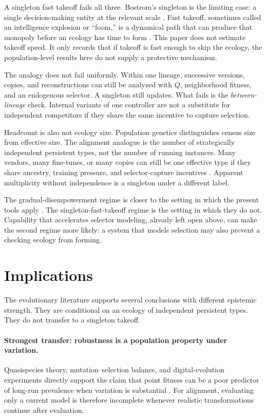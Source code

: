\documentclass[11pt]{article}
\begin{document}
A singleton fast takeoff fails all three. Bostrom's singleton is the limiting case: a single decision-making entity at the relevant scale \parencite{bostrom2014}. Fast takeoff, sometimes called an intelligence explosion or ``foom,'' is a dynamical path that can produce that monopoly before an ecology has time to form \parencite{yudkowsky2022}. This paper does not estimate takeoff speed. It only records that if takeoff is fast enough to skip the ecology, the population-level results here do not supply a protective mechanism.

The analogy does not fail uniformly. Within one lineage, successive versions, copies, and reconstructions can still be analyzed with $Q$, neighborhood fitness, and an endogenous selector. A singleton still updates. What fails is the \emph{between-lineage} check. Internal variants of one controller are not a substitute for independent competitors if they share the same incentive to capture selection.

Headcount is also not ecology size. Population genetics distinguishes census size from effective size. The alignment analogue is the number of strategically independent persistent types, not the number of running instances. Many vendors, many fine-tunes, or many copies can still be one effective type if they share ancestry, training pressure, and selector-capture incentives \parencite{kulveit2025pando}. Apparent multiplicity without independence is a singleton under a different label.

The gradual-disempowerment regime is closer to the setting in which the present tools apply \parencite{kulveit2025gradual}. The singleton-fast-takeoff regime is the setting in which they do not. Capability that accelerates selector modeling, already left open above, can make the second regime more likely: a system that models selection may also prevent a checking ecology from forming.

\section{Implications}

The evolutionary literature supports several conclusions with different epistemic strength. They are conditional on an ecology of independent persistent types. They do not transfer to a singleton takeoff.

\paragraph{Strongest transfer: robustness is a population property under variation.}
Quasispecies theory, mutation--selection balance, and digital-evolution experiments directly support the claim that point fitness can be a poor predictor of long-run prevalence when variation is substantial \parencite{wilke2001,hermisson2002}. For alignment, evaluating only a current model is therefore incomplete whenever realistic transformations continue after evaluation.
\end{document}
